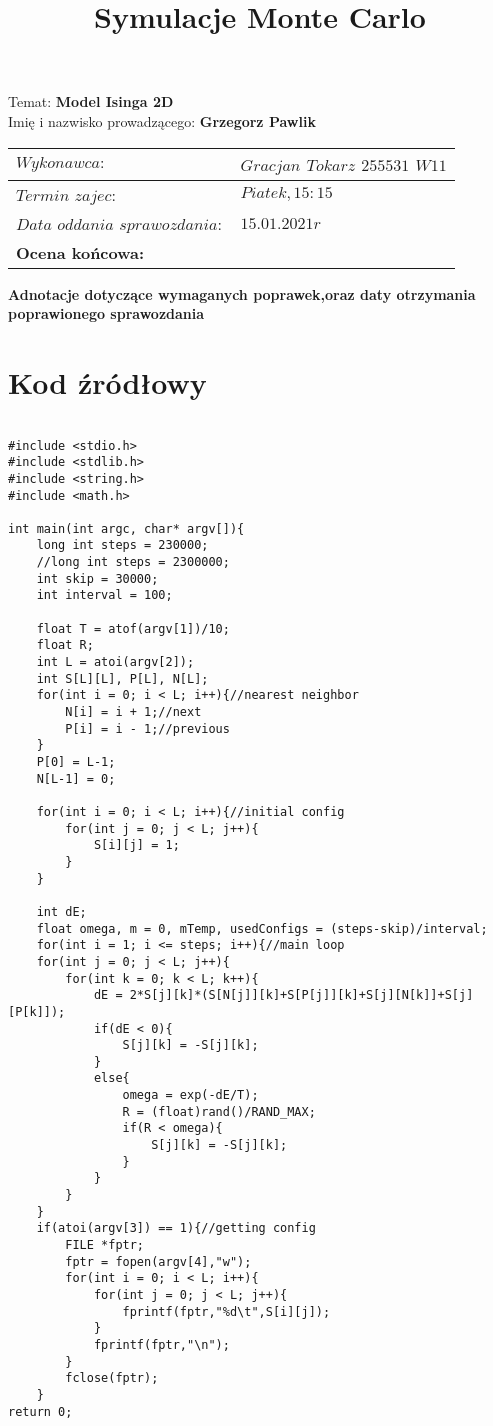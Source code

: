 \documentclass{article}
\title{Symulacje Monte Carlo}
\date{}
\begin{document}
\maketitle
Temat: \textbf{Model Isinga 2D}\\
Imię i nazwisko prowadzącego: \textbf{Grzegorz Pawlik}

\begin{center}
\begin{tabular}{|p{5cm}|p{6cm}|}
\hline
$Wykonawca:$ & $Gracjan$ $Tokarz$ $255531$ $W11$  \\
\hline
$Termin$ $zajec:$ & $Piatek , 15:15$\\
\hline
$Data$ $oddania$ $sprawozdania:$ & $15.01.2021r$\\
\hline
\textbf{Ocena	końcowa:} & \\
\hline
\end{tabular}
\end{center}

\textbf{Adnotacje dotyczące wymaganych poprawek,oraz daty otrzymania poprawionego sprawozdania}

\newpage

\section{Kod źródłowy}

\lstset{
	language=C++
}
\begin{lstlisting}[basicstyle=\small]

#include <stdio.h>
#include <stdlib.h>
#include <string.h>
#include <math.h>

int main(int argc, char* argv[]){
	long int steps = 230000;
	//long int steps = 2300000;
	int skip = 30000;
	int interval = 100;

	float T = atof(argv[1])/10;
	float R;
	int L = atoi(argv[2]);
	int S[L][L], P[L], N[L];
	for(int i = 0; i < L; i++){//nearest neighbor
		N[i] = i + 1;//next
		P[i] = i - 1;//previous
	}
	P[0] = L-1;
	N[L-1] = 0;

	for(int i = 0; i < L; i++){//initial config
		for(int j = 0; j < L; j++){
			S[i][j] = 1;
		}
	}

	int dE; 
	float omega, m = 0, mTemp, usedConfigs = (steps-skip)/interval;
	for(int i = 1; i <= steps; i++){//main loop
	for(int j = 0; j < L; j++){
		for(int k = 0; k < L; k++){
			dE = 2*S[j][k]*(S[N[j]][k]+S[P[j]][k]+S[j][N[k]]+S[j][P[k]]);
			if(dE < 0){
				S[j][k] = -S[j][k];
			}
			else{
				omega = exp(-dE/T);
				R = (float)rand()/RAND_MAX;
				if(R < omega){
					S[j][k] = -S[j][k];
				}
			}
		}
	}
	if(atoi(argv[3]) == 1){//getting config
		FILE *fptr;
		fptr = fopen(argv[4],"w");
		for(int i = 0; i < L; i++){
			for(int j = 0; j < L; j++){
				fprintf(fptr,"%d\t",S[i][j]);
			}
			fprintf(fptr,"\n");
		}
		fclose(fptr);
	}	
return 0;

\end{lstlisting}
\end{document}
